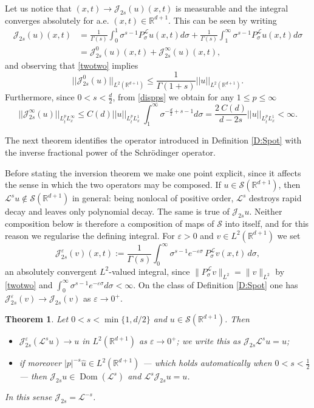 \documentclass[11pt,letter]{amsart}
\def \R {\mathbb{R}}
\def \G{\Gamma}
\numberwithin{equation}{section}
\newcommand{\ve}{\varepsilon}
\newcommand{\Le}{\mathcal L}
\newcommand{\ps}{P_\sigma^{\Le}}
\newcommand{\Dom}{\operatorname{Dom}}
\newtheorem{theorem}{Theorem}[section]
\numberwithin{equation}{section}
\begin{document}
Let us notice that $(x,t)\to \mathscr J_{2s}(u)(x,t)$ is measurable and the integral converges absolutely for a.e. $(x,t)\in \R^{d+1}$. This can be seen by writing
\begin{align*}
\mathscr J_{2s}(u)(x,t) & = \frac{1}{\G(s)} \int_0^1 \sigma^{s -1} \ps u(x,t) d\sigma + \frac{1}{\G(s)} \int_1^\infty \sigma^{s -1} \ps u(x,t) d\sigma
\\
& = \mathscr J^0_{2s}(u)(x,t) + \mathscr J^\infty_{2s}(u)(x,t),
\end{align*}
and observing that
\eqref{twotwo} implies 
\[
||\mathscr J^0_{2s}(u)||_{L^2(\R^{d+1})} \le \frac{1}{\G(1+s)} ||u||_{L^2(\R^{d+1})}.
\]
Furthermore, since $0<s<\frac d2$, from \eqref{dispps} we obtain for any $1\le p\le \infty$
\[
||\mathscr J^\infty_{2s}(u)||_{L^p_t L^{\infty}_x} \le C(d) ||u||_{L^p_t L^{1}_x}\ \int_1^\infty \sigma^{-\frac d2 + s -1} d\sigma = \frac{2\ C(d)}{d-2s} ||u||_{L^p_t L^{1}_x} < \infty. 
\]

The next theorem identifies the operator introduced in Definition \ref{D:Spot} with the inverse
fractional power of the Schr\"odinger operator.


Before stating the inversion theorem we make one point explicit, since it
affects the sense in which the two operators may be composed. If
$u\in\mathscr S(\R^{d+1})$, then $\Le^su\notin\mathscr S(\R^{d+1})$ in general:
being nonlocal of positive order, $\Le^s$ destroys rapid decay and leaves only
polynomial decay. The same is true of $\mathscr J_{2s}u$. Neither composition
below is therefore a composition of maps of $\mathscr S$ into itself, and for
this reason we regularise the defining integral. For $\ve>0$ and
$v\in L^2(\R^{d+1})$ we set
\begin{equation}\label{Jeps}
\mathscr J^\ve_{2s}(v)(x,t) := \frac{1}{\G(s)} \int_0^\infty \sigma^{s -1} e^{-\ve \sigma}\,P^\Le_\sigma v(x,t)\, d\sigma,
\end{equation}
an absolutely convergent $L^2$-valued integral, since
$\|P^\Le_\sigma v\|_{L^2}=\|v\|_{L^2}$ by \eqref{twotwo} and
$\int_0^\infty \sigma^{s-1}e^{-\ve\sigma}d\sigma<\infty$. On the class of
Definition \ref{D:Spot} one has $\mathscr J^\ve_{2s}(v)\to \mathscr J_{2s}(v)$
as $\ve\to0^+$.

\begin{theorem}\label{T:inverse}
Let $0<s<\min\{1,d/2\}$ and $u\in \mathscr S(\R^{d+1})$. Then
\begin{itemize}
\item[(i)] $\mathscr J^\ve_{2s}(\Le^s u)\longrightarrow u$ in $L^2(\R^{d+1})$ as
$\ve\to0^+$; we write this as $\mathscr J_{2s}\Le^su=u$;
\item[(ii)] if moreover $|p|^{-s}\hat u\in L^2(\R^{d+1})$ --- which holds
automatically when $0<s<\frac12$ --- then $\mathscr J_{2s}u\in\Dom(\Le^s)$ and
$\Le^s\mathscr J_{2s}u=u$.
\end{itemize}
In this sense $\mathscr J_{2s}=\Le^{-s}$.
\end{theorem}
\end{document}
